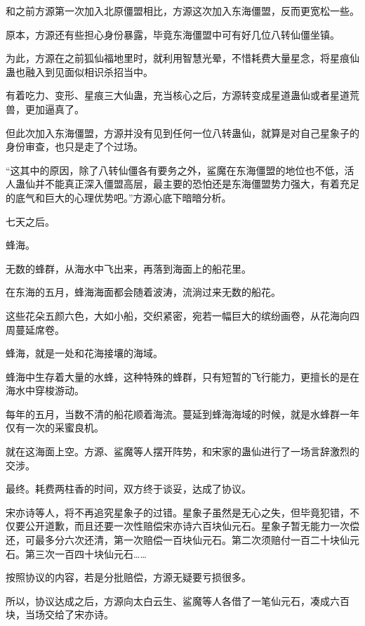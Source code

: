 
\begin{this_body}

和之前方源第一次加入北原僵盟相比，方源这次加入东海僵盟，反而更宽松一些。

原本，方源还有些担心身份暴露，毕竟东海僵盟中可有好几位八转仙僵坐镇。

为此，方源在之前狐仙福地里时，就利用智慧光晕，不惜耗费大量星念，将星痕仙蛊也融入到见面似相识杀招当中。

有着吃力、变形、星痕三大仙蛊，充当核心之后，方源转变成星道蛊仙或者星道荒兽，更加逼真了。

但此次加入东海僵盟，方源并没有见到任何一位八转蛊仙，就算是对自己星象子的身份审查，也只是走了个过场。

“这其中的原因，除了八转仙僵各有要务之外，鲨魔在东海僵盟的地位也不低，活人蛊仙并不能真正深入僵盟高层，最主要的恐怕还是东海僵盟势力强大，有着充足的底气和巨大的心理优势吧。”方源心底下暗暗分析。

七天之后。

蜂海。

无数的蜂群，从海水中飞出来，再落到海面上的船花里。

在东海的五月，蜂海海面都会随着波涛，流淌过来无数的船花。

这些花朵五颜六色，大如小船，交织紧密，宛若一幅巨大的缤纷画卷，从花海向四周蔓延席卷。

蜂海，就是一处和花海接壤的海域。

蜂海中生存着大量的水蜂，这种特殊的蜂群，只有短暂的飞行能力，更擅长的是在海水中穿梭游动。

每年的五月，当数不清的船花顺着海流。蔓延到蜂海海域的时候，就是水蜂群一年仅有一次的采蜜良机。

就在这海面上空。方源、鲨魔等人摆开阵势，和宋家的蛊仙进行了一场言辞激烈的交涉。

最终。耗费两柱香的时间，双方终于谈妥，达成了协议。

宋亦诗等人，将不再追究星象子的过错。星象子虽然是无心之失，但毕竟犯错，不仅要公开道歉，而且还要一次性赔偿宋亦诗六百块仙元石。星象子暂无能力一次偿还，可最多分六次还清，第一次赔偿一百块仙元石。第二次须赔付一百二十块仙元石。第三次一百四十块仙元石……

按照协议的内容，若是分批赔偿，方源无疑要亏损很多。

所以，协议达成之后，方源向太白云生、鲨魔等人各借了一笔仙元石，凑成六百块，当场交给了宋亦诗。


\end{this_body}
